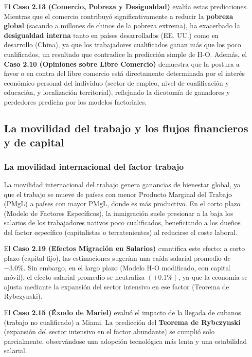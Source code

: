 El \textbf{Caso 2.13 (Comercio, Pobreza y Desigualdad)} evalúa estas predicciones. Mientras que el comercio contribuyó significativamente a reducir la \textbf{pobreza global} (sacando a millones de chinos de la pobreza extrema), ha exacerbado la \textbf{desigualdad interna} tanto en países desarrollados (EE. UU.) como en desarrollo (China), ya que los trabajadores cualificados ganan más que los poco cualificados, un resultado que contradice la predicción simple de H-O. Además, el \textbf{Caso 2.10 (Opiniones sobre Libre Comercio)} demuestra que la postura a favor o en contra del libre comercio está directamente determinada por el interés económico personal del individuo (sector de empleo, nivel de cualificación y educación, y localización territorial), reflejando la dicotomía de ganadores y perdedores predicha por los modelos factoriales.

\subsection{La movilidad del trabajo y los flujos financieros y de capital}

\subsubsection{La movilidad internacional del factor trabajo}
La movilidad internacional del trabajo genera ganancias de bienestar global, ya que el trabajo se mueve de países con menor Producto Marginal del Trabajo (PMgL) a países con mayor PMgL, donde es más productivo. En el corto plazo (Modelo de Factores Específicos), la inmigración suele presionar a la baja los salarios de los trabajadores nativos poco cualificados, beneficiando a los dueños del factor específico (capitalistas o terratenientes) al reducirse el coste laboral.

El \textbf{Caso 2.19 (Efectos Migración en Salarios)} cuantifica este efecto: a corto plazo (capital fijo), las estimaciones sugerían una caída salarial promedio de $-3.0\%$. Sin embargo, en el largo plazo (Modelo H-O modificado, con capital móvil), el efecto salarial promedio se neutraliza $(+0.1\%)$, ya que la economía se ajusta mediante la expansión del sector intensivo en ese factor (Teorema de Rybczynski).

El \textbf{Caso 2.15 (Éxodo de Mariel)} evaluó el impacto de la llegada de cubanos (trabajo no cualificado) a Miami. La predicción del \textbf{Teorema de Rybczynski} (expansión del sector intensivo en el factor abundante) se cumplió solo parcialmente, observándose una adopción tecnológica más lenta y una estabilidad salarial.

